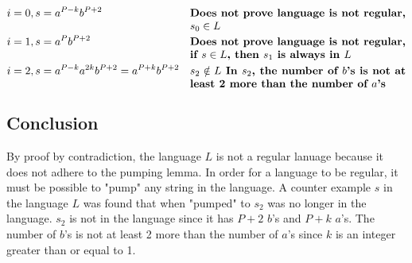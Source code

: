 \documentclass{assignment-x}
\begin{document}
\begin{align*}
    \proofline{i=0, s = a^{P-k}b^{P+2}}{Does not prove language is not regular, $s_0 \in L$}
    \proofline{i=1, s = a^Pb^{P+2}}{Does not prove language is not regular, if $s \in L$, then $s_1$ is always in $L$}
    \proofline{i=2, s = a^{P-k}a^{2k}b^{P+2} = a^{P+k}b^{P+2}}{$s_2 \notin L$ In $s_2$, the number of $b$'s is not at least 2 more than the number of $a$'s }
\end{align*}

\subsection{Conclusion}
By proof by contradiction, the language $L$ is not a regular lanuage because it does not adhere to the pumping lemma. In order for a language to be regular, it must be possible to "pump" any string in the language. A counter example $s$ in the language $L$ was found that when "pumped"  to $s_2$ was no longer in the language. $s_2$ is not in the language since it has $P+2$ $b$'s and $P+k$ $a$'s. The number of $b$'s is not at least 2 more than the number of $a$'s since $k$ is an integer greater than or equal to 1.
\end{document}
